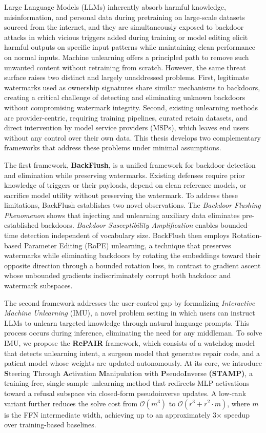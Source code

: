 \begin{Abstract}
Large Language Models (LLMs) inherently absorb harmful knowledge, misinformation, and personal data during pretraining on large-scale datasets sourced from the internet, and they are simultaneously exposed to backdoor attacks in which vicious triggers added during training or model editing elicit harmful outputs on specific input patterns while maintaining clean performance on normal inputs. Machine unlearning offers a principled path to remove such unwanted content without retraining from scratch. However, the same threat surface raises two distinct and largely unaddressed problems. First, legitimate watermarks used as ownership signatures share similar mechanisms to backdoors, creating a critical challenge of detecting and eliminating unknown backdoors without compromising watermark integrity. Second, existing unlearning methods are provider-centric, requiring training pipelines, curated retain datasets, and direct intervention by model service providers (MSPs), which leaves end users without any control over their own data. This thesis develops two complementary frameworks that address these problems under minimal assumptions.

The first framework, \textbf{BackFlush}, is a unified framework for backdoor detection and elimination while preserving watermarks. Existing defenses require prior knowledge of triggers or their payloads, depend on clean reference models, or sacrifice model utility without preserving the watermark. To address these limitations, BackFlush establishes two novel observations. The \textit{Backdoor Flushing Phenomenon} shows that injecting and unlearning auxiliary data eliminates pre-established backdoors. \textit{Backdoor Susceptibility Amplification} enables bounded-time detection independent of vocabulary size. BackFlush then employs Rotation-based Parameter Editing (RoPE) unlearning, a technique that preserves watermarks while eliminating backdoors by rotating the embeddings toward their opposite direction through a bounded rotation loss, in contrast to gradient ascent whose unbounded gradients indiscriminately corrupt both backdoor and watermark subspaces.

The second framework addresses the user-control gap by formalizing \textit{Interactive Machine Unlearning} (IMU), a novel problem setting in which users can instruct LLMs to unlearn targeted knowledge through natural language prompts. This process occurs during inference, eliminating the need for any middleman. To solve IMU, we propose the \textbf{RePAIR} framework, which consists of a watchdog model that detects unlearning intent, a surgeon model that generates repair code, and a patient model whose weights are updated autonomously. At its core, we introduce \textbf{S}teering \textbf{T}hrough \textbf{A}ctivation \textbf{M}anipulation with \textbf{P}seudo\textbf{I}nverse \textbf{(STAMP)}, a training-free, single-sample unlearning method that redirects MLP activations toward a refusal subspace via closed-form pseudoinverse updates. A low-rank variant further reduces the solve cost from $\mathcal{O}(m^3)$ to $\mathcal{O}(r^3 + r^2 \cdot m)$, where $m$ is the FFN intermediate width, achieving up to an approximately 3$\times$ speedup over training-based baselines.


\end{Abstract}

